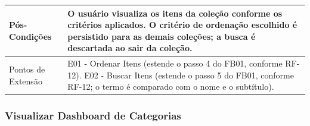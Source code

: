 \begin{longtable}{ >{\raggedright}p{2.8cm} | >{\raggedright\arraybackslash}p{10.7cm} }
Pós-Condições & O usuário visualiza os itens da coleção conforme os critérios aplicados. O critério de ordenação escolhido é persistido para as demais coleções; a busca é descartada ao sair da coleção. \\ \hline

Pontos de Extensão & E01 - Ordenar Itens (estende o passo 4 do FB01, conforme RF-12). E02 - Buscar Itens (estende o passo 5 do FB01, conforme RF-12; o termo é comparado com o nome e o subtítulo). \\
\end{longtable}
\renewcommand{\arraystretch}{1}
\FloatBarrier


\subsubsection{Visualizar Dashboard de Categorias}

